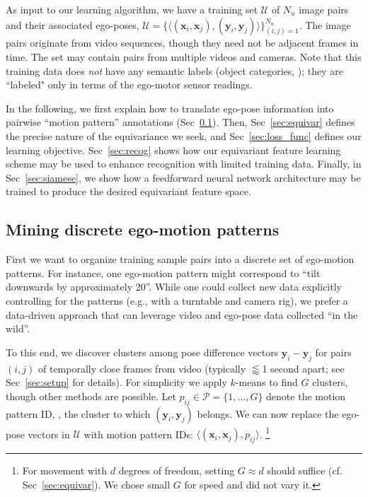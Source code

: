 \documentclass[10pt,twocolumn,letterpaper]{article}
\begin{document}
As input to our learning algorithm, we have a training set $\mathcal{U}$ of $N_u$ image pairs and their associated ego-poses, $\mathcal{U} = \{\langle (\bm{x}_i,\bm{x}_j), (\bm{y}_i, \bm{y}_j) \rangle\}_{(i,j)=1}^{N_u}$.
%
The image pairs originate from video sequences, though they need not be adjacent frames in time.   The set may contain pairs from multiple videos and cameras.  Note that this training data does \emph{not} have any semantic labels (object categories, \etc); they are ``labeled" only in terms of the ego-motor sensor readings.

In the following, we first explain how to translate ego-pose information into pairwise ``motion pattern'' annotations (Sec~\ref{sec:motionPatterns}).  Then, Sec~\ref{sec:equivar} defines the precise nature of the equivariance we seek, and Sec~\ref{sec:loss_func} defines our learning objective. Sec~\ref{sec:recog} shows how our equivariant feature learning scheme may be used to enhance recognition with limited training data. Finally, in Sec~\ref{sec:siamese}, we show how a feedforward neural network architecture may be trained to produce the desired equivariant feature space.

\subsection{Mining discrete ego-motion patterns}\label{sec:motionPatterns}

First we want to organize training sample pairs into a discrete set of ego-motion patterns.  For instance, one ego-motion pattern might correspond to ``tilt downwards by approximately 20\textdegree''.
While one could collect new data explicitly controlling for the patterns (e.g., with a turntable and camera rig), we prefer a data-driven approach that can leverage video and ego-pose data collected ``in the wild''.
%

To this end, we discover clusters among pose difference vectors $\bm{y}_i-\bm{y}_j$ for pairs $(i,j)$ of temporally close frames from video (typically $\lessapprox$1 second apart; see Sec~\ref{sec:setup} for details).  For simplicity we apply $k$-means to find $G$ clusters, though other methods are possible.  Let $p_{ij}\in\mathcal{P}=\{1,\dots,G\}$ denote the motion pattern ID, \ie, the cluster to which $(\bm{y}_i,\bm{y}_j)$ belongs.  We can now replace the ego-pose vectors in $\mathcal{U}$ with motion pattern IDs: $\langle (\bm{x}_i,\bm{x}_j), p_{ij} \rangle$.
\footnote{For movement with $d$ degrees of freedom, setting $G\approx d$ should suffice (cf. Sec~\ref{sec:equivar}). We chose small $G$ for speed and did not vary it.}%
\end{document}
